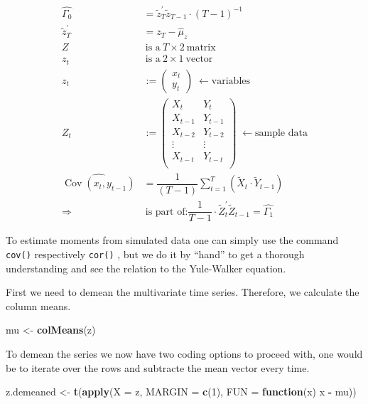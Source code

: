 \documentclass[12pt,a4paper]{article}
\newcommand{\Cov}{\operatorname{Cov}}
\newenvironment{Shaded}{\begin{snugshade}}{\end{snugshade}}
\newcommand{\ControlFlowTok}[1]{\textcolor[rgb]{0.13,0.29,0.53}{\textbf{#1}}}
\newcommand{\DataTypeTok}[1]{\textcolor[rgb]{0.13,0.29,0.53}{#1}}
\newcommand{\DecValTok}[1]{\textcolor[rgb]{0.00,0.00,0.81}{#1}}
\newcommand{\KeywordTok}[1]{\textcolor[rgb]{0.13,0.29,0.53}{\textbf{#1}}}
\newcommand{\NormalTok}[1]{#1}
\newcommand{\OperatorTok}[1]{\textcolor[rgb]{0.81,0.36,0.00}{\textbf{#1}}}
\newcommand{\StringTok}[1]{\textcolor[rgb]{0.31,0.60,0.02}{#1}}
\begin{document}
\begin{align*}
  \widehat{\Gamma_0} & = \tilde{z}_T^{'} \tilde{z}_{T-1} \cdot (T - 1)^{-1} \\
  \tilde{z}_T^{'} & = z_T - \widehat{\mu}_z\\
  Z & \ \text{is a} \ T \times 2 \ \text{matrix}\\
  z_t &\  \text{is a} \ 2 \times 1 \ \text{vector}\\
  z_t & := 
  \begin{pmatrix}
    x_t \\
    y_t
  \end{pmatrix} \; \leftarrow \text{variables}\\
  Z_t & := 
  \begin{pmatrix}
    X_{t} & Y_{t} \\
    X_{t-1} & Y_{t-1} \\
    X_{t-2} & Y_{t-2} \\
    \vdots & \vdots \\
    X_{t-t} & Y_{t-t} \\
  \end{pmatrix} \; \leftarrow \text{sample data}\\
  \widehat{\Cov(x_t, y_{t-1})} & = \dfrac{1}{(T - 1)} \sum_{t = 1}^{T}  \left( \tilde{X}_t \cdot \tilde{Y}_{t- 1} \right)\\
  \Rightarrow & \ \text{is part of:} \dfrac{1}{T -1} \cdot \tilde{Z}_t^{'} \tilde{Z}_{t-1} = \widehat{\Gamma_1}
\end{align*}

To estimate moments from simulated data one can simply use the command
\texttt{cov()} respectively \texttt{cor()} , but we do it by
\enquote{hand} to get a thorough understanding and see the relation to
the Yule-Walker equation.

First we need to demean the multivariate time series. Therefore, we
calculate the column means.

\begin{Shaded}
\begin{Highlighting}[]
\NormalTok{mu <-}\StringTok{ }\KeywordTok{colMeans}\NormalTok{(z)}
\end{Highlighting}
\end{Shaded}

To demean the series we now have two coding options to proceed with, one
would be to iterate over the rows and subtracte the mean vector every
time.

\begin{Shaded}
\begin{Highlighting}[]
\NormalTok{z.demeaned <-}\StringTok{ }\KeywordTok{t}\NormalTok{(}\KeywordTok{apply}\NormalTok{(}\DataTypeTok{X =}\NormalTok{ z, }\DataTypeTok{MARGIN =} \KeywordTok{c}\NormalTok{(}\DecValTok{1}\NormalTok{), }\DataTypeTok{FUN =} \ControlFlowTok{function}\NormalTok{(x) x }\OperatorTok{-}\StringTok{ }\NormalTok{mu))}
\end{Highlighting}
\end{Shaded}
\end{document}
